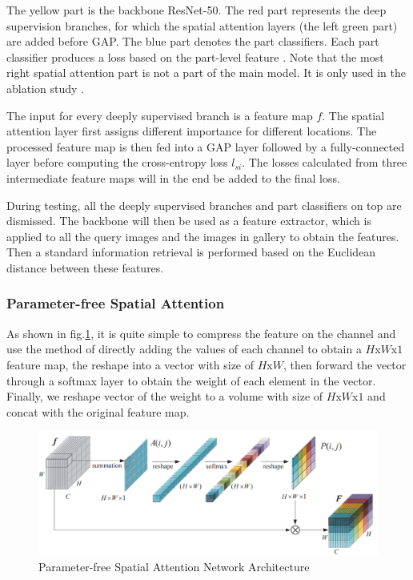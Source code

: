 The yellow part is the backbone ResNet-50\cite{He_2016_CVPR}. The red part represents the deep supervision branches, for which the spatial attention layers (the left green part) are added before \acrshort{GAP}. The blue part denotes the part classifiers. Each part classifier produces a loss based on the part-level feature \cite{SA}. Note that the most right spatial attention part is not a part of the main model. It is only used in the ablation study \cite{SA}.\par
The input for every deeply supervised branch is a feature map $f$. The spatial attention layer first assigns different importance for different locations. The processed feature map is then fed into a \acrshort{GAP} layer followed by a fully-connected layer before computing the cross-entropy loss $l_{si}$\cite{SA}. The losses calculated from three intermediate feature maps will in the end be added to the final loss\cite{SA}.\par
During testing, all the deeply supervised branches and
part classifiers on top are dismissed. The backbone will then
be used as a feature extractor, which is applied to all the
query images and the images in gallery to obtain the features\cite{SA}. Then a standard information retrieval is performed
based on the Euclidean distance between these features\cite{SA}.
\subsubsection{Parameter-free Spatial Attention}
\hspace{0.45cm}As shown in fig.\ref{fig:sa}\cite{SA}, it is quite simple to compress the feature on the channel and use the method of directly adding the values of each channel to obtain a $H$x$W$x$1$ feature map, the reshape into a vector with size of $H$x$W$, then forward the vector through a softmax layer to obtain the weight of each element in the vector. Finally, we reshape vector of the weight to a volume with size of $H$x$W$x$1$ and concat with the original feature map.

\begin{figure}[h!]
    \centering
    \includegraphics[scale=0.4]{Chapters/Fig/attention_sa.PNG}
    \caption{Parameter-free Spatial Attention Network Architecture}
    \label{fig:sa}
\end{figure}

